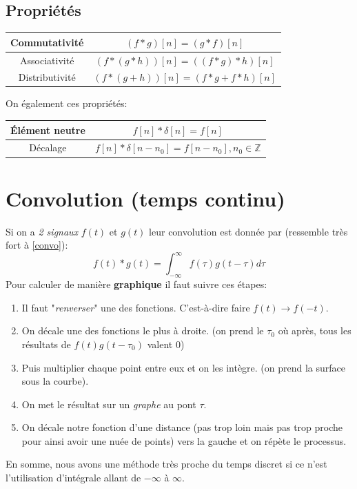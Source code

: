 \documentclass{report}
\begin{document}
\subsection{Propriétés}
\begin{center}
\begin{tabular}{c|c}
	Commutativité & $(f\ast g)[n] = (g \ast f)[n]$ \\
	\hline
	Associativité & $(f \ast (g \ast h))[n] = ((f \ast g) \ast h)[n]$ \\
	\hline
	Distributivité & $(f \ast (g + h))[n] = (f \ast g + f \ast h)[n]$ \\
\end{tabular}
\end{center}
On également ces propriétés:
\begin{center}
\begin{tabular}{c|c}
	Élément neutre & $f[n] \ast \delta[n] = f[n]$ \\
	\hline
	Décalage & $f[n] \ast \delta[n-n_0] = f[n-n_0], n_0 \in \mathbb{Z}$ \\
\end{tabular}
\end{center}

\section{Convolution (temps continu)}
Si on a \textit{2 signaux} $f(t)$ et $g(t)$ leur convolution est donnée par (ressemble très fort à \ref{convo}):
\begin{equation}
f(t) \ast g(t) = \int_{-\infty}^{\infty}f(\tau)g(t-\tau)d\tau
\end{equation}
Pour calculer de manière \textbf{graphique} il faut suivre ces étapes:
\begin{enumerate}
\item Il faut "\textit{renverser}" une des fonctions. C'est-à-dire faire $f(t) \rightarrow f(-t)$.
\item On décale une des fonctions le plus à droite. (on prend le $\tau_0$ où après, tous les résultats de $f(t)g(t-\tau_0)$ valent $0$) 
\item Puis multiplier chaque point entre eux et on les intègre. (on prend la surface sous la courbe).
\item On met le résultat sur un \textit{graphe} au pont $\tau$.
\item On décale notre fonction d'une distance (pas trop loin mais pas trop proche pour ainsi avoir une nuée de points) vers la gauche et on répète le processus.
\end{enumerate}
En somme, nous avons une méthode très proche du temps discret si ce n'est l'utilisation d'intégrale allant de $-\infty$ à $\infty$.
\end{document}
